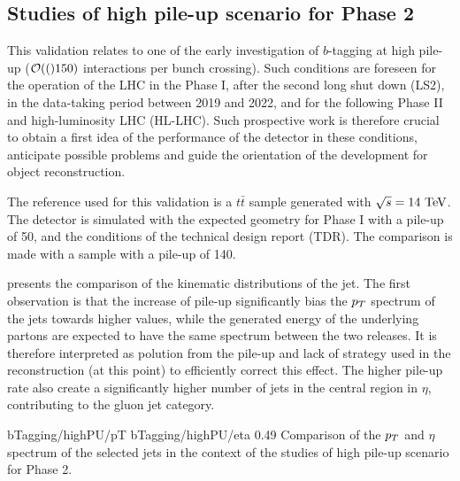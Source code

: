         \subsection{Studies of high pile-up scenario for Phase 2}

        This validation relates to one of the early investigation of $b$-tagging at high
        pile-up ($\mathcal{O}(()150)$ interactions per bunch crossing). Such conditions are
        foreseen for the operation of the LHC in the Phase I, after the second long shut
        down (LS2), in the data-taking period between 2019 and 2022, and for the following
        Phase II and high-luminosity LHC (HL-LHC). Such prospective work is therefore
        crucial to obtain a first idea of the performance of the detector in these conditions,
        anticipate possible problems and guide the orientation of the development for object
        reconstruction.

        The reference used for this validation is a $t\bar{t}$ sample generated with $\sqrt{s}
        = 14~\text{TeV}$. The detector is simulated with the expected geometry for Phase I with
        a pile-up of 50, and the conditions of the technical design report (TDR). The
        comparison is made with a sample with a pile-up of 140.

         presents the comparison of the kinematic
        distributions of the jet. The first observation is that the increase of pile-up
        significantly bias the $p_T$ spectrum of the jets towards higher values, while the
        generated energy of the underlying partons are expected to have the same spectrum
        between the two releases. It is therefore interpreted as polution from the pile-up
        and lack of strategy used in the reconstruction (at this point) to efficiently
        correct this effect. The higher pile-up rate also create a significantly higher
        number of jets in the central region in $\eta$, contributing to the gluon jet
        category.

                         {bTagging/highPU/pT}
                         {bTagging/highPU/eta}
                         {0.49}
                         {Comparison of the $p_T$ and $\eta$ spectrum of the selected jets
                         in the context of the studies of high pile-up scenario for Phase 2.}

